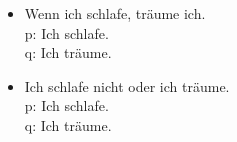 {\begin{frame}
\begin{table}
\begin{minipage}{0.48\textwidth}
\centering
\begin{itemize}
\item[] \small{Wenn ich schlafe, träume ich.\\
               p: Ich schlafe.\\
               q: Ich träume.}
\end{itemize}
\end{minipage}
%
\begin{minipage}{0.48\textwidth}
\centering
\begin{itemize}
\item[] \small{Ich schlafe nicht oder ich träume.\\
               p: Ich schlafe.\\
               q: Ich träume.}
\end{itemize}
\end{minipage}
\end{table}

\end{frame}
%
}



